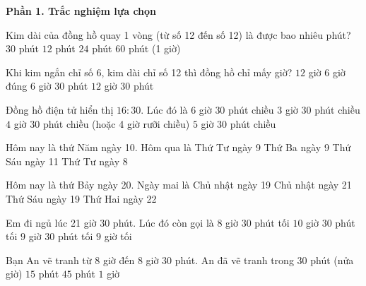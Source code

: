 \textbf{Phần 1. Trắc nghiệm lựa chọn}

\begin{ex} %
Kim dài của đồng hồ quay 1 vòng (từ số 12 đến số 12) là được bao nhiêu phút?
\choice
{$30$ phút}
{$12$ phút}
{$24$ phút}
{\True $60$ phút (1 giờ)}
\end{ex}

\begin{ex} %
Khi kim ngắn chỉ số 6, kim dài chỉ số 12 thì đồng hồ chỉ mấy giờ?
\choice
{$12$ giờ}
{\True $6$ giờ đúng}
{$6$ giờ $30$ phút}
{$12$ giờ $30$ phút}
\end{ex}

\begin{ex} %
Đồng hồ điện tử hiển thị $16:30$. Lúc đó là
\choice
{$6$ giờ $30$ phút chiều}
{$3$ giờ $30$ phút chiều}
{\True $4$ giờ $30$ phút chiều (hoặc 4 giờ rưỡi chiều)}
{$5$ giờ $30$ phút chiều}
\end{ex}

\begin{ex} %
Hôm nay là thứ Năm ngày 10. Hôm qua là
\choice
{\True Thứ Tư ngày 9}
{Thứ Ba ngày 9}
{Thứ Sáu ngày 11}
{Thứ Tư ngày 8}
\end{ex}

\begin{ex} %
Hôm nay là thứ Bảy ngày 20. Ngày mai là
\choice
{Chủ nhật ngày 19}
{\True Chủ nhật ngày 21}
{Thứ Sáu ngày 19}
{Thứ Hai ngày 22}
\end{ex}

\begin{ex} %
Em đi ngủ lúc 21 giờ 30 phút. Lúc đó còn gọi là
\choice
{$8$ giờ $30$ phút tối}
{$10$ giờ $30$ phút tối}
{\True $9$ giờ $30$ phút tối}
{$9$ giờ tối}
\end{ex}

\begin{ex} %
Bạn An vẽ tranh từ 8 giờ đến 8 giờ 30 phút. An đã vẽ tranh trong
\choice
{\True $30$ phút (nửa giờ)}
{$15$ phút}
{$45$ phút}
{$1$ giờ}
\end{ex}

